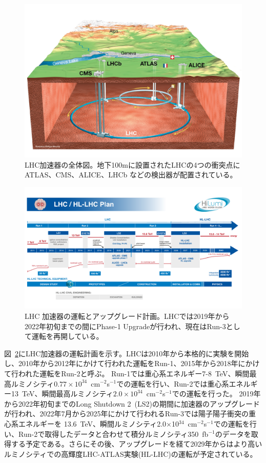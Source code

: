 \begin{figure}[tb]
  \centering
  \includegraphics[clip, width=14cm]{fig/2/LHC_overview.pdf}
  \caption{LHC加速器の全体図\cite{article:Overall_view_LHC}。地下100mに設置されたLHCの4つの衝突点に ATLAS、CMS、ALICE、LHCb などの検出器が配置されている。}
  \label{fig:LHC_overview}
\end{figure}

\begin{figure}[tb]
  \centering
  \includegraphics[clip, width=15cm]{fig/1/HL-LHC_Janvier2022.pdf}
  \caption{LHC 加速器の運転とアップグレード計画\cite{article:LHCDesignReport}。LHCでは2019年から2022年初旬までの間にPhase-1 Upgradeが行われ、現在はRun-3として運転を再開している。}
  \label{fig:LHC_Plan}
\end{figure}

図~\ref{fig:LHC_Plan}にLHC加速器の運転計画を示す。LHCは2010年から本格的に実験を開始し、2010年から2012年にかけて行われた運転を\mbox{Run-1}、2015年から2018年にかけて行われた運転をRun-2と呼ぶ。
 \mbox{Run-1}では重心系エネルギー7-8~TeV、瞬間最高ルミノシティ$0.77\times10^{34}$~cm$^{-2}$s$^{-1}$での運転を行い、Run-2では重心系エネルギー13~TeV、瞬間最高ルミノシティ$2.0\times10^{34}$~cm$^{-2}$s$^{-1}$での運転を行った。
2019年から2022年初旬までのLong Shutdown 2~(LS2)の期間に加速器のアップグレードが行われ、2022年7月から2025年にかけて行われるRun-3では陽子陽子衝突の重心系エネルギーを 13.6~TeV、瞬間ルミノシティ2.0$\times$10$^{34}$~cm$^{-2}$s$^{-1}$での運転を行い、Run-2で取得したデータと合わせて積分ルミノシティ350~fb$^{-1}$のデータを取得する予定である。さらにその後、アップグレードを経て2029年からはより高いルミノシティでの高輝度LHC-ATLAS実験(HL-LHC)の運転が予定されている。



